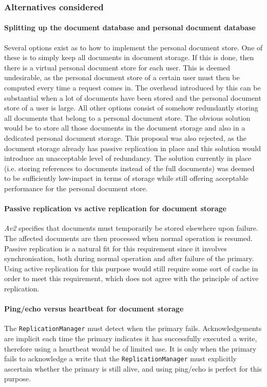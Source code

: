 \documentclass[a4paper,10pt]{article}
\begin{document}
\subsubsection*{Alternatives considered}
\paragraph{Splitting up the document database and personal document database}
Several options exist as to how to implement the personal document store. One of these is to simply keep all documents in document storage. If this is done, then there is a virtual personal document store for each user. This is deemed undesirable, as the personal document store of a certain user must then be computed every time a request comes in. The overhead introduced by this can be substantial when a lot of documents have been stored and the personal document store of a user is large. All other options consist of somehow redundantly storing all documents that belong to a personal document store. The obvious solution would be to store all those documents in the document storage and also in a dedicated personal document storage. This proposal was also rejected, as the document storage already has passive replication in place and this solution would introduce an unacceptable level of redundancy. The solution currently in place (i.e. storing references to documents instead of the full documents) was deemed to be sufficiently low-impact in terms of storage while still offering acceptable performance for the personal document store.

\paragraph{Passive replication vs active replication for document storage}
\emph{Av2} specifies that documents must temporarily be stored elsewhere upon failure. The affected documents are then processed when normal operation is resumed. Passive replication is a natural fit for this requirement since it involves synchronisation, both during normal operation and after failure of the primary. Using active replication for this purpose would still require some sort of cache in order to meet this requirement, which does not agree with the principle of active replication.

\paragraph{Ping/echo versus heartbeat for document storage}
The \texttt{ReplicationManager} must detect when the primary fails. Acknowledgements are implicit each time the primary indicates it has successfully executed a write, therefore using a heartbeat would be of limited use. It is only when the primary fails to acknowledge a write that the \texttt{ReplicationManager} must explicitly ascertain whether the primary is still alive, and using ping/echo is perfect for this purpose.
\end{document}
